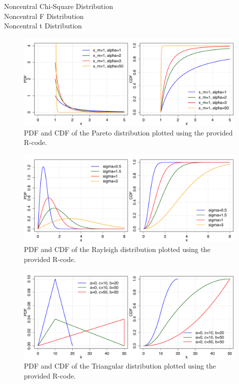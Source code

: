 Noncentral Chi-Square Distribution\\
Noncentral F Distribution\\
Noncentral t Distribution\\

\begin{figure}[htb!]
\centering
  \includegraphics[width=140mm]{pics/Pareto_pdf_cdf.pdf}
 \caption{PDF and CDF of the Pareto distribution plotted using the provided R-code.}
 \label{fig:Pareto_pdf_cdf}
\end{figure}

\begin{figure}[htb!]
\centering
  \includegraphics[width=140mm]{pics/Rayleigh_pdf_cdf.pdf}
 \caption{PDF and CDF of the Rayleigh distribution plotted using the provided R-code.}
 \label{fig:Rayleigh_pdf_cdf}
\end{figure}

\begin{figure}[htb!]
\centering
  \includegraphics[width=140mm]{pics/Triangular_pmf_cdf.pdf}
 \caption{PDF and CDF of the Triangular distribution plotted using the provided R-code.}
 \label{fig:Triangular_pmf_cdf}
\end{figure}



